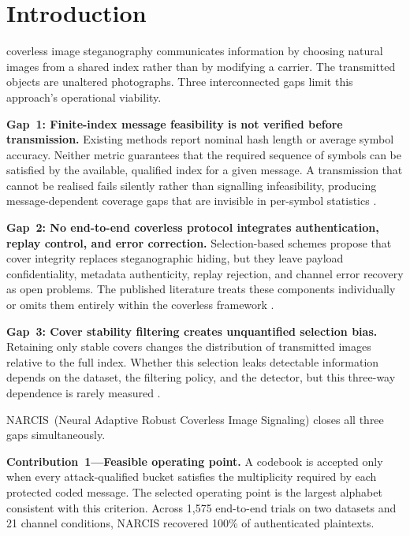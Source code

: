 ﻿\documentclass[10pt,journal]{IEEEtran}
\newcommand{\method}{NARCIS\xspace}
\begin{document}
\section{Introduction}
\label{sec:introduction}

 coverless image steganography
communicates information by choosing natural images from a shared
index rather than by modifying a carrier. The transmitted objects are
unaltered photographs. Three interconnected gaps limit this approach's
operational viability.

\textbf{Gap~1: Finite-index message feasibility is not verified before
transmission.} Existing methods report nominal hash length or average
symbol accuracy. Neither metric guarantees that the required sequence
of symbols can be satisfied by the available, qualified index for a
given message. A transmission that cannot be realised fails silently
rather than signalling infeasibility, producing message-dependent
coverage gaps that are invisible in per-symbol statistics
\cite{zhou2015coverless,meng2024review}.

\textbf{Gap~2: No end-to-end coverless protocol integrates
authentication, replay control, and error correction.} Selection-based
schemes propose that cover integrity replaces steganographic hiding, but
they leave payload confidentiality, metadata authenticity, replay
rejection, and channel error recovery as open problems. The published
literature treats these components individually or omits them entirely
within the coverless framework \cite{zheng2017hashing,li2024surf,
guo2025diverse,guo2026capacity}.

\textbf{Gap~3: Cover stability filtering creates unquantified selection
bias.} Retaining only stable covers changes the distribution of
transmitted images relative to the full index. Whether this selection
leaks detectable information depends on the dataset, the filtering
policy, and the detector, but this three-way dependence is rarely
measured \cite{fridrich2012rich,cachin1998steganography}.

\method~(Neural Adaptive Robust Coverless Image Signaling) closes all
three gaps simultaneously.

\textbf{Contribution~1---Feasible operating point.} A codebook is
accepted only when every attack-qualified bucket satisfies the
multiplicity required by each protected coded message. The selected
operating point is the largest alphabet consistent with this criterion.
Across 1{,}575 end-to-end trials on two datasets and 21 channel
conditions, \method recovered 100\% of authenticated plaintexts.
\end{document}
